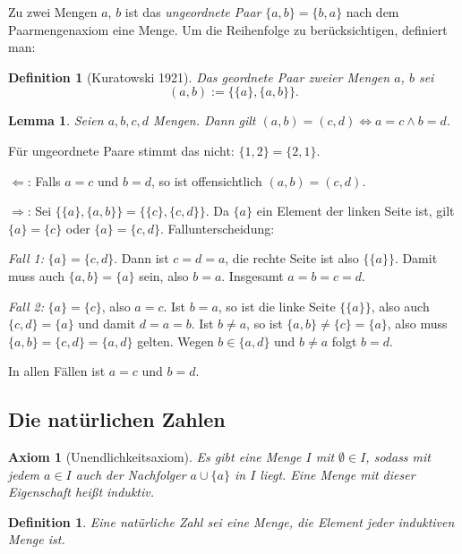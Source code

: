\documentclass[a4paper]{article}
\makeatletter
\theoremstyle{kurzskript}
\newtheorem{definition}[satz]{Definition}
\newtheorem{lemma}[satz]{Lemma}
\newtheorem{axiom}{Axiom}                    %
\renewenvironment{proof}[1][\proofname]{\par\pushQED{\qed}%
  \normalfont\topsep\medskipamount\relax
  \trivlist\item[\hskip\labelsep\bfseries #1\@addpunct{.}]\ignorespaces}%
  {\popQED\endtrivlist\@endpefalse}
\renewcommand{\proofname}{Beweis}
\makeatother
\begin{document}
Zu zwei Mengen $a$, $b$ ist das \emph{ungeordnete Paar} $\{a, b\} = \{b, a\}$ nach dem Paarmengenaxiom eine Menge. Um die Reihenfolge zu berücksichtigen, definiert man:

\begin{definition}[Kuratowski 1921]
Das \emph{geordnete Paar} zweier Mengen $a$, $b$ sei
\[
  (a, b) := \bigl\{\{a\}, \{a, b\}\bigr\}.
\]
\end{definition}

\begin{lemma}
Seien $a, b, c, d$ Mengen. Dann gilt $(a, b) = (c, d) \iff a = c \land b = d$.
\end{lemma}

Für ungeordnete Paare stimmt das nicht: $\{1, 2\} = \{2, 1\}$.

\begin{proof}
\glqq$\Leftarrow$\grqq: Falls $a = c$ und $b = d$, so ist offensichtlich $(a, b) = (c, d)$.

\glqq$\Rightarrow$\grqq: Sei $\bigl\{\{a\}, \{a, b\}\bigr\} = \bigl\{\{c\}, \{c, d\}\bigr\}$. Da $\{a\}$ ein Element der linken Seite ist, gilt $\{a\} = \{c\}$ oder $\{a\} = \{c, d\}$. Fallunterscheidung:

\emph{Fall 1:} $\{a\} = \{c, d\}$. Dann ist $c = d = a$, die rechte Seite ist also $\bigl\{\{a\}\bigr\}$. Damit muss auch $\{a, b\} = \{a\}$ sein, also $b = a$. Insgesamt $a = b = c = d$.

\emph{Fall 2:} $\{a\} = \{c\}$, also $a = c$. Ist $b = a$, so ist die linke Seite $\bigl\{\{a\}\bigr\}$, also auch $\{c, d\} = \{a\}$ und damit $d = a = b$. Ist $b \neq a$, so ist $\{a, b\} \neq \{c\} = \{a\}$, also muss $\{a, b\} = \{c, d\} = \{a, d\}$ gelten. Wegen $b \in \{a, d\}$ und $b \neq a$ folgt $b = d$.

In allen Fällen ist $a = c$ und $b = d$.
\end{proof}

\subsection{Die natürlichen Zahlen}

\begin{axiom}[Unendlichkeitsaxiom]
Es gibt eine Menge $I$ mit $\emptyset \in I$, sodass mit jedem $a \in I$ auch der \emph{Nachfolger} $a \cup \{a\}$ in $I$ liegt. Eine Menge mit dieser Eigenschaft heißt \emph{induktiv}.
\end{axiom}

\begin{definition}
Eine \emph{natürliche Zahl} sei eine Menge, die Element jeder induktiven Menge ist.
\end{definition}
\end{document}
